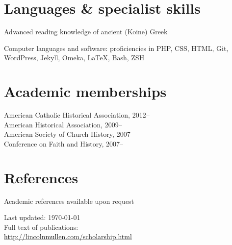 \documentclass[11pt]{article}
\begin{document}
\section{Languages \& specialist skills}

Advanced reading knowledge of ancient (Koine) Greek

Computer languages and software: proficiencies in PHP, CSS, HTML, Git,
\mbox{WordPress}, Jekyll, Omeka, \LaTeX{}, Bash, ZSH


\section{Academic memberships}
American Catholic Historical Association, 2012--\\
American Historical Association, 2009--\\
American Society of Church History, 2007--\\
Conference on Faith and History, 2007--\\

\section{References}
Academic references available upon request

\vfill{}

\begin{center}
{\scriptsize 
Last updated: \today\\[.25cm]
Full text of publications:\\
\href{http://lincolnmullen.com/scholarship.html}{http://lincolnmullen.com/scholarship.html}\\[.1cm]
}
\end{center}
\end{document}
